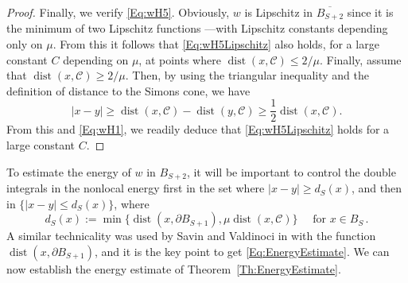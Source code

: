 \documentclass[12pt,reqno]{amsart}
\theoremstyle{definition}
\theoremstyle{remark}
\newcommand{\ccal}{\mathscr{C}}
\DeclareMathOperator{\dist}{dist}
\numberwithin{equation}{section}
\begin{document}
\begin{proof}
	Finally, we verify \eqref{Eq:wH5}. Obviously, $w$ is Lipschitz in $\overline{B_{S+2}}$ since it is the minimum of two Lipschitz functions ---with Lipschitz constants depending only on $\mu$. From this it follows that \eqref{Eq:wH5Lipschitz} also holds, for a large constant $C$ depending on $\mu$, at points where $\dist(x,\ccal)\leq 2/\mu$. Finally, assume that $\dist(x,\ccal)\geq 2/\mu$. Then, by using the triangular inequality and the definition of distance to the Simons cone, we have
	$$
	|x-y| \geq 	\dist(x,\ccal) - \dist(y,\ccal) \geq \dfrac{1}{2}\dist(x,\ccal).
	$$
	From this and \eqref{Eq:wH1}, we readily deduce that \eqref{Eq:wH5Lipschitz} holds for a large constant $C$.	
\end{proof}



To estimate the energy of $w$ in $B_{S+2}$, it will be important to control the double integrals in the nonlocal energy  first in the set where $|x-y|\geq d_S(x)$, and then in $\{|x-y|\leq d_S(x)\}$, where 
$$ 
d_S (x) 
:= \min \{\dist(x, \partial B_{S+1}),\mu \dist(x,\ccal)\} \quad \text{ for } x\in B_S\,.
$$
A similar technicality was used by Savin and Valdinoci in \cite{SavinValdinoci-EnergyEstimate} with the function $\dist(x, \partial B_{S+1})$, and it is the key point to get \eqref{Eq:EnergyEstimate}. We can now establish the energy estimate of Theorem~\ref{Th:EnergyEstimate}. 
\end{document}
